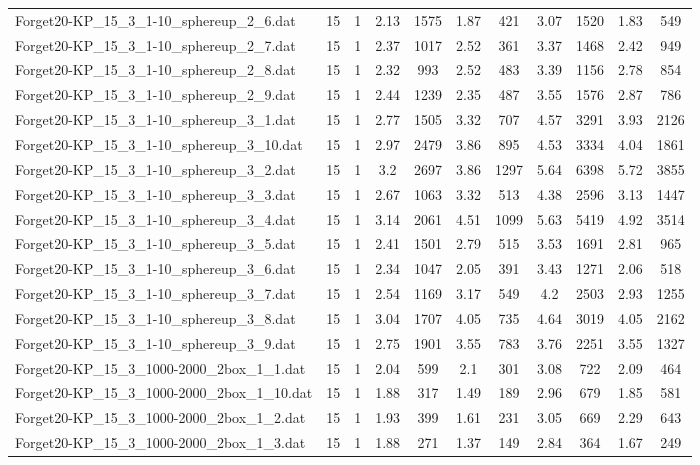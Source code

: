 \begin{table}[!ht]
\begin{tabular}{lcccccccccc}
Forget20-KP\_15\_3\_1-10\_sphereup\_2\_6.dat & 15 & 1 & 2.13 & 1575 & 1.87 & 421 & 3.07 & 1520 & 1.83 & 549 \\
Forget20-KP\_15\_3\_1-10\_sphereup\_2\_7.dat & 15 & 1 & 2.37 & 1017 & 2.52 & 361 & 3.37 & 1468 & 2.42 & 949 \\
Forget20-KP\_15\_3\_1-10\_sphereup\_2\_8.dat & 15 & 1 & 2.32 & 993 & 2.52 & 483 & 3.39 & 1156 & 2.78 & 854 \\
Forget20-KP\_15\_3\_1-10\_sphereup\_2\_9.dat & 15 & 1 & 2.44 & 1239 & 2.35 & 487 & 3.55 & 1576 & 2.87 & 786 \\
Forget20-KP\_15\_3\_1-10\_sphereup\_3\_1.dat & 15 & 1 & 2.77 & 1505 & 3.32 & 707 & 4.57 & 3291 & 3.93 & 2126 \\
Forget20-KP\_15\_3\_1-10\_sphereup\_3\_10.dat & 15 & 1 & 2.97 & 2479 & 3.86 & 895 & 4.53 & 3334 & 4.04 & 1861 \\
Forget20-KP\_15\_3\_1-10\_sphereup\_3\_2.dat & 15 & 1 & 3.2 & 2697 & 3.86 & 1297 & 5.64 & 6398 & 5.72 & 3855 \\
Forget20-KP\_15\_3\_1-10\_sphereup\_3\_3.dat & 15 & 1 & 2.67 & 1063 & 3.32 & 513 & 4.38 & 2596 & 3.13 & 1447 \\
Forget20-KP\_15\_3\_1-10\_sphereup\_3\_4.dat & 15 & 1 & 3.14 & 2061 & 4.51 & 1099 & 5.63 & 5419 & 4.92 & 3514 \\
Forget20-KP\_15\_3\_1-10\_sphereup\_3\_5.dat & 15 & 1 & 2.41 & 1501 & 2.79 & 515 & 3.53 & 1691 & 2.81 & 965 \\
Forget20-KP\_15\_3\_1-10\_sphereup\_3\_6.dat & 15 & 1 & 2.34 & 1047 & 2.05 & 391 & 3.43 & 1271 & 2.06 & 518 \\
Forget20-KP\_15\_3\_1-10\_sphereup\_3\_7.dat & 15 & 1 & 2.54 & 1169 & 3.17 & 549 & 4.2 & 2503 & 2.93 & 1255 \\
Forget20-KP\_15\_3\_1-10\_sphereup\_3\_8.dat & 15 & 1 & 3.04 & 1707 & 4.05 & 735 & 4.64 & 3019 & 4.05 & 2162 \\
Forget20-KP\_15\_3\_1-10\_sphereup\_3\_9.dat & 15 & 1 & 2.75 & 1901 & 3.55 & 783 & 3.76 & 2251 & 3.55 & 1327 \\
Forget20-KP\_15\_3\_1000-2000\_2box\_1\_1.dat & 15 & 1 & 2.04 & 599 & 2.1 & 301 & 3.08 & 722 & 2.09 & 464 \\
Forget20-KP\_15\_3\_1000-2000\_2box\_1\_10.dat & 15 & 1 & 1.88 & 317 & 1.49 & 189 & 2.96 & 679 & 1.85 & 581 \\
Forget20-KP\_15\_3\_1000-2000\_2box\_1\_2.dat & 15 & 1 & 1.93 & 399 & 1.61 & 231 & 3.05 & 669 & 2.29 & 643 \\
Forget20-KP\_15\_3\_1000-2000\_2box\_1\_3.dat & 15 & 1 & 1.88 & 271 & 1.37 & 149 & 2.84 & 364 & 1.67 & 249 \\

\end{tabular}
\end{table}

